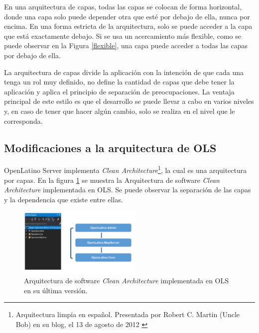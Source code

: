En una arquitectura de capas, todas las capas se colocan de forma horizontal, donde una capa solo puede depender otra que est\'e por debajo de ella, nunca por encima. En una forma estricta de la arquitectura, solo se puede acceder a la capa que est\'a exactamente debajo. Si se usa un acercamiento m\'as flexible, como se puede observar en la Figura \ref{flexible}, una capa puede acceder a todas las capas por debajo de ella. \cite{architecture}

La arquitectura de capas divide la aplicaci\'on con la intenci\'on de que cada una tenga un rol muy definido, no define la cantidad de capas que debe tener la aplicaci\'on y aplica el principio de separaci\'on de preocupaciones. La ventaja principal de este estilo es que el desarrollo se puede llevar a cabo en varios niveles y, en caso de tener que hacer alg\'un cambio, solo se realiza en el nivel que le corresponda.

\subsection{Modificaciones a la arquitectura de OLS}
OpenLatino Server implementa \textit{Clean Architecture}\footnote{Arquitectura limpia en espa\~nol. Presentada por Robert C. Martin (Uncle Bob) en su blog, el 13 de agosto de 2012 \cite{cleanArchitecture}}, la cual es una arquitectura por capas.  En la figura \ref{cleanArchitecture} se muestra la Arquitectura de software \textit{Clean Architecture} implementada en OLS. Se puede observar la separaci\'on de las capas y la dependencia que existe entre ellas.

\begin{figure} 
\vspace{-20pt} 
\begin{center} 
\includegraphics[width=0.53\textwidth]{images/cleanArchitecture.png} 
\end{center} \vspace{-20pt} \caption{Arquitectura de software \textit{Clean Architecture} implementada en OLS en su \'ultima versi\'on.} \label{cleanArchitecture} \vspace{-10pt} 
\end{figure}

